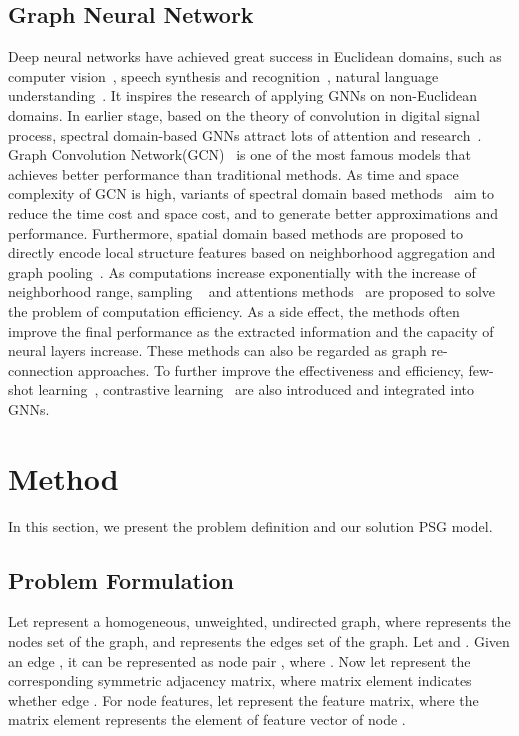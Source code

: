 \documentclass[sigconf]{acmart}
\begin{document}
\subsection{Graph Neural Network} Deep neural networks have achieved great success in Euclidean domains, such as computer vision~\cite{liu2021swin}, speech synthesis and recognition~\cite{snyder2018x}, natural language understanding~\cite{devlin2018bert}. It inspires the research of applying GNNs on non-Euclidean domains. In earlier stage, based on the theory of convolution in digital signal process, spectral domain-based GNNs attract lots of attention and research~\cite{wu2020comprehensive,zhou2020graph}. Graph Convolution Network(GCN)~\cite{kipf2016semi} is one of the most famous models that achieves better performance than traditional methods. As time and space complexity of GCN is high,  variants of spectral domain based methods~\cite{defferrard2016convolutional, levie2018cayleynets, huang2022graph} aim to reduce the time cost and space cost, and to generate better approximations and performance. Furthermore, spatial domain based methods are proposed to directly encode local structure features based on neighborhood aggregation and graph pooling~\cite{gilmer2017neural}. As computations increase exponentially with the increase of neighborhood range, sampling ~\cite{hamilton2017inductive} and attentions methods~\cite{velivckovic2017graph} are proposed to solve the problem of computation efficiency. As a side effect, the methods often improve the final performance as the extracted information and the capacity of neural layers increase. These methods can also be regarded as graph re-connection approaches. To further improve the effectiveness and efficiency, few-shot learning~\cite{lin2022structure}, contrastive learning~\cite{liu2021anomaly} are also introduced and integrated into GNNs.



\section{Method}  \label{section_method}
In this section, we present the problem definition and our solution PSG model.

\subsection{Problem Formulation}
Let  represent a homogeneous, unweighted, undirected graph, where  represents the nodes set of the graph, and  represents the edges set of the graph. Let  and . Given an edge , it can be represented as node pair , where .  Now let  represent the corresponding symmetric adjacency matrix, where matrix element  indicates whether edge . For node features, let  represent the feature matrix, where the matrix element  represents the  element of feature vector of node .
\end{document}

